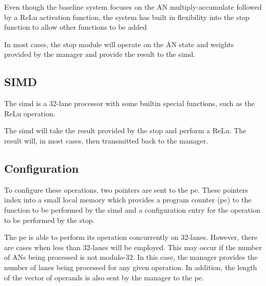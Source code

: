Even though the baseline system focuses on the AN multiply-accumulate followed by a ReLu activation function, the system has built in flexibility into the \ac{stop} function to allow other functions to be added

In most cases, the \ac{stop} module will operate on the AN state and weights provided by the manager and provide the result to the \ac{simd}.
\subsection{SIMD}
\label{sec:SIMD}

The \ac{simd} is a 32-lane processor with some builtin special functions, such as the ReLu operation.

The \ac{simd} will take the result provided by the \ac{stop} and perform a ReLu. The result will, in most cases, then transmitted back to the manager.

\subsection{Configuration}
\label{sec:peConfiguration}

To configure these operations, two pointers are sent to the \ac{pe}. These pointers index into a small local memory which provides a program counter (\ac{pc}) to the function to be performed by the \ac{simd} and a configuration entry for the operation to be performed by the \ac{stop}.

The \ac{pe} is able to perform its operation concurrently on 32-lanes. However, there are cases when less than 32-lanes will be employed. This may occur if the number of ANs being processed is not modulo-32. In this case, the manager provides the number of lanes being processed for any given operation. In addition, the length of the vector of operands is also sent by the manager to the \ac{pe}.




